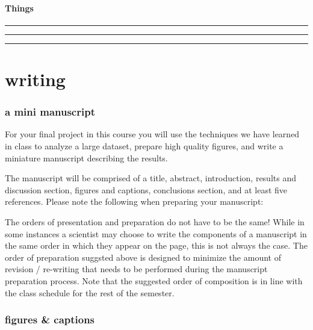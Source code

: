 \documentclass[
]{krantz}
\begin{document}
\hypertarget{things-2}{%
\subsection{Things}\label{things-2}}

\begin{center}\rule{0.5\linewidth}{0.5pt}\end{center}

\begin{center}\rule{0.5\linewidth}{0.5pt}\end{center}

\begin{center}\rule{0.5\linewidth}{0.5pt}\end{center}

\hypertarget{part-writing}{%
\part{writing}\label{part-writing}}

\hypertarget{a-mini-manuscript}{%
\section*{a mini manuscript}\label{a-mini-manuscript}}

For your final project in this course you will use the techniques we have learned in class to analyze a large dataset, prepare high quality figures, and write a miniature manuscript describing the results.

The manuscript will be comprised of a title, abstract, introduction, results and discussion section, figures and captions, conclusions section, and at least five references. Please note the following when preparing your manuscript:

The orders of presentation and preparation do not have to be the same! While in some instances a scientist may choose to write the components of a manuscript in the same order in which they appear on the page, this is not always the case. The order of preparation suggsted above is designed to minimize the amount of revision / re-writing that needs to be performed during the manuscript preparation process. Note that the suggested order of composition is in line with the class schedule for the rest of the semester.

\hypertarget{figures-captions}{%
\section{figures \& captions}\label{figures-captions}}
\end{document}
